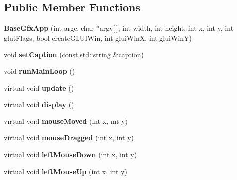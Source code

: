 \subsection*{Public Member Functions}
\begin{DoxyCompactItemize}
\item 
\hypertarget{classBaseGfxApp_a534a4b5293a35947fdae3805a103541d}{{\bfseries Base\-Gfx\-App} (int argc, char $\ast$argv\mbox{[}$\,$\mbox{]}, int width, int height, int x, int y, int glut\-Flags, bool create\-G\-L\-U\-I\-Win, int glui\-Win\-X, int glui\-Win\-Y)}\label{classBaseGfxApp_a534a4b5293a35947fdae3805a103541d}

\item 
\hypertarget{classBaseGfxApp_a4b3b1a475b7f2babaf1b477c34b15fb1}{void {\bfseries set\-Caption} (const std\-::string \&caption)}\label{classBaseGfxApp_a4b3b1a475b7f2babaf1b477c34b15fb1}

\item 
\hypertarget{classBaseGfxApp_acda031916c00d56c2dc901e2653e3083}{void {\bfseries run\-Main\-Loop} ()}\label{classBaseGfxApp_acda031916c00d56c2dc901e2653e3083}

\item 
\hypertarget{classBaseGfxApp_a35b64aa3d604736ceb036698d1a0b2d0}{virtual void {\bfseries update} ()}\label{classBaseGfxApp_a35b64aa3d604736ceb036698d1a0b2d0}

\item 
\hypertarget{classBaseGfxApp_ac8de2d5a955582547af5619b771b4d6d}{virtual void {\bfseries display} ()}\label{classBaseGfxApp_ac8de2d5a955582547af5619b771b4d6d}

\item 
\hypertarget{classBaseGfxApp_a0956b82d7fa58b623c498aea7073dbba}{virtual void {\bfseries mouse\-Moved} (int x, int y)}\label{classBaseGfxApp_a0956b82d7fa58b623c498aea7073dbba}

\item 
\hypertarget{classBaseGfxApp_abb23f716dd6612b3a72938e41525d338}{virtual void {\bfseries mouse\-Dragged} (int x, int y)}\label{classBaseGfxApp_abb23f716dd6612b3a72938e41525d338}

\item 
\hypertarget{classBaseGfxApp_aaaccf5a5e923a9465441a5ee712424a8}{virtual void {\bfseries left\-Mouse\-Down} (int x, int y)}\label{classBaseGfxApp_aaaccf5a5e923a9465441a5ee712424a8}

\item 
\hypertarget{classBaseGfxApp_a0a2961a932b02b2f9d7d0bb408f6fb51}{virtual void {\bfseries left\-Mouse\-Up} (int x, int y)}\label{classBaseGfxApp_a0a2961a932b02b2f9d7d0bb408f6fb51}


\end{DoxyCompactItemize}
